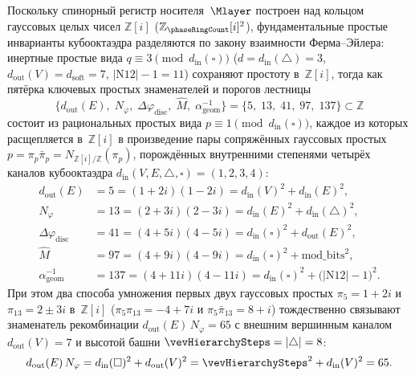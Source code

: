 \begin{lemma}
\label{lem:cosmo-five-splitting-primes-zi}
Поскольку спинорный регистр носителя~$\Mlayer$ построен над кольцом гауссовых целых чисел $\mathbb{Z}[i]$ ($\mathbb{Z}_{\phaseRingCount}[i]^2$), фундаментальные простые инварианты кубооктаэдра разделяются по закону взаимности Ферма--Эйлера: инертные простые вида $q \equiv 3 \pmod{d_{\mathrm{in}}(\square)}$ ($d = d_{\mathrm{in}}(\triangle) = 3$, $d_{\mathrm{out}}(V) = d_{\mathrm{soft}} = 7$, $|\mathrm{N12}| - 1 = 11$) сохраняют простоту в~$\mathbb{Z}[i]$, тогда как пятёрка ключевых простых знаменателей и порогов лестницы
\[
  \bigl\{d_{\mathrm{out}}(E),\; N_\varphi,\; \Delta\varphi_{\mathrm{disc}},\; \hat M,\; \alpha_{\mathrm{geom}}^{-1}\bigr\}
  = \bigl\{5,\; 13,\; 41,\; 97,\; 137\bigr\} \subset \mathbb{Z}
\]
состоит из рациональных простых вида $p \equiv 1 \pmod{d_{\mathrm{in}}(\square)}$, каждое из которых расщепляется в~$\mathbb{Z}[i]$ в произведение пары сопряжённых гауссовых простых $p = \pi_p\bar\pi_p = N_{\mathbb{Z}[i]/\mathbb{Z}}(\pi_p)$, порождённых внутренними степенями четырёх каналов кубооктаэдра $d_{\mathrm{in}}(V,E,\triangle,\square) = (1,2,3,4)$:
\begin{equation}
\label{eq:cosmo-five-splitting-primes-zi}
\begin{aligned}
  d_{\mathrm{out}}(E) &= 5 = (1+2i)(1-2i) = d_{\mathrm{in}}(V)^2 + d_{\mathrm{in}}(E)^2,\\
  N_\varphi &= 13 = (2+3i)(2-3i) = d_{\mathrm{in}}(E)^2 + d_{\mathrm{in}}(\triangle)^2,\\
  \Delta\varphi_{\mathrm{disc}} &= 41 = (4+5i)(4-5i) = d_{\mathrm{in}}(\square)^2 + d_{\mathrm{out}}(E)^2,\\
  \hat M &= 97 = (4+9i)(4-9i) = d_{\mathrm{in}}(\square)^2 + \mathrm{mod\_bits}^2,\\
  \alpha_{\mathrm{geom}}^{-1} &= 137 = (4+11i)(4-11i) = d_{\mathrm{in}}(\square)^2 + \bigl(|\mathrm{N12}| - 1\bigr)^2.
\end{aligned}
\end{equation}
При этом два способа умножения первых двух гауссовых простых $\pi_5 = 1 + 2i$ и $\pi_{13} = 2 \pm 3i$ в~$\mathbb{Z}[i]$ ($\pi_5\pi_{13} = -4 + 7i$ и $\pi_5\bar\pi_{13} = 8 + i$) тождественно связывают знаменатель рекомбинации $d_{\mathrm{out}}(E)\,N_\varphi = 65$ с внешним вершинным каналом $d_{\mathrm{out}}(V) = 7$ и высотой башни $\vevHierarchySteps = |\triangle| = 8$:
\begin{equation}
\label{eq:cosmo-brahmagupta-65}
  d_{\mathrm{out}}(E)\,N_\varphi
  = d_{\mathrm{in}}(\square)^2 + d_{\mathrm{out}}(V)^2
  = \vevHierarchySteps^2 + d_{\mathrm{in}}(V)^2
  = 65.
\end{equation}
\end{lemma}

